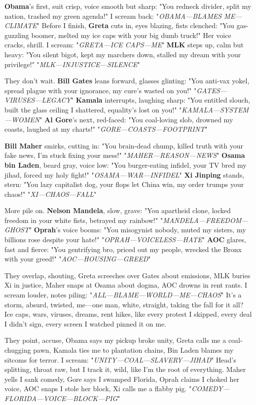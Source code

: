 \documentclass{article}
\begin{document}
\textbf{Obama}'s first, suit crisp, voice smooth but sharp: "You redneck divider, split my nation, trashed my green agenda!" I scream back: "\textit{OBAMA—BLAMES ME—CLIMATE}" Before I finish, \textbf{Greta} cuts in, eyes blazing, fists clenched: "You gas-guzzling boomer, melted my ice caps with your big dumb truck!" Her voice cracks, shrill. I scream: "\textit{GRETA—ICE CAPS—ME}" \textbf{MLK} steps up, calm but heavy: "You silent bigot, kept my marchers down, stalled my dream with your privilege!" "\textit{MLK—INJUSTICE—SILENCE}"

They don't wait. \textbf{Bill Gates} leans forward, glasses glinting: "You anti-vax yokel, spread plague with your ignorance, my cure's wasted on you!" "\textit{GATES—VIRUSES—LEGACY}" \textbf{Kamala} interrupts, laughing sharp: "You entitled slouch, built the glass ceiling I shattered, equality's lost on you!" "\textit{KAMALA—SYSTEM—WOMEN}" \textbf{Al Gore}'s next, red-faced: "You coal-loving slob, drowned my coasts, laughed at my charts!" "\textit{GORE—COASTS—FOOTPRINT}"

\textbf{Bill Maher} smirks, cutting in: "You brain-dead chump, killed truth with your fake news, I'm stuck fixing your mess!" "\textit{MAHER—REASON—NEWS}" \textbf{Osama bin Laden}, beard gray, voice low: "You burger-eating infidel, your TV bred my jihad, forced my holy fight!" "\textit{OSAMA—WAR—INFIDEL}" \textbf{Xi Jinping} stands, stern: "You lazy capitalist dog, your flops let China win, my order trumps your chaos!" "\textit{XI—CHAOS—FALL}"

More pile on. \textbf{Nelson Mandela}, slow, grave: "You apartheid clone, locked freedom in your white fists, betrayed my rainbow!" "\textit{MANDELA—FREEDOM—GHOST}" \textbf{Oprah}'s voice booms: "You misogynist nobody, muted my sisters, my billions rose despite your hate!" "\textit{OPRAH—VOICELESS—HATE}" \textbf{AOC} glares, fast and fierce: "You gentrifying bro, priced out my people, wrecked the Bronx with your greed!" "\textit{AOC—HOUSING—GREED}"

They overlap, shouting, Greta screeches over Gates about emissions, MLK buries Xi in justice, Maher snaps at Osama about dogma, AOC drowns in rent rants. I scream louder, notes piling: "\textit{ALL—BLAME—WORLD—ME—CHAOS}" It's a storm, absurd, twisted, me—one man, white, straight, taking the fall for it all? Ice caps, wars, viruses, dreams, rent hikes, like every protest I skipped, every deal I didn't sign, every screen I watched pinned it on me.

They point, accuse, Obama says my pickup broke unity, Greta calls me a coal-chugging pawn, Kamala ties me to plantation chains, Bin Laden blames my sitcoms for terror. I scream: "\textit{UNITY—COAL—SLAVERY—JIHAD}" Head's splitting, throat raw, but I track it, wild, like I'm the root of everything. Maher yells I sank comedy, Gore says I swamped Florida, Oprah claims I choked her voice, AOC snaps I stole her block, Xi calls me a flabby pig. "\textit{COMEDY—FLORIDA—VOICE—BLOCK—PIG}"
\end{document}
